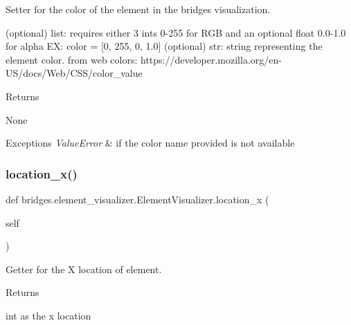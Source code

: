 Setter for the color of the element in the bridges visualization. 

\begin{DoxyVerb}       (optional) list: requires either 3 ints 0-255 for RGB and an optional float 0.0-1.0 for alpha EX: color = [0, 255, 0, 1.0]
       (optional) str: string representing the element color. from web colors: https://developer.mozilla.org/en-US/docs/Web/CSS/color_value
\end{DoxyVerb}
 \begin{DoxyReturn}{Returns}


None
\end{DoxyReturn}

\begin{DoxyExceptions}{Exceptions}
{\em Value\+Error} & if the color name provided is not available \\
\hline
\end{DoxyExceptions}
\mbox{\label{classbridges_1_1element__visualizer_1_1_element_visualizer_a10fc24a04e43afcb393f3444bd93f5d9}} 
\subsubsection{\texorpdfstring{location\_x()}{location\_x()}}
{\footnotesize\ttfamily def bridges.\+element\+\_\+visualizer.\+Element\+Visualizer.\+location\+\_\+x (\begin{DoxyParamCaption}\item[{}]{self }\end{DoxyParamCaption})}



Getter for the X location of element. 

\begin{DoxyReturn}{Returns}


int as the x location 
\end{DoxyReturn}
\mbox{\label{classbridges_1_1element__visualizer_1_1_element_visualizer_a687747f04ae17dea9d15706602688a32}} 

